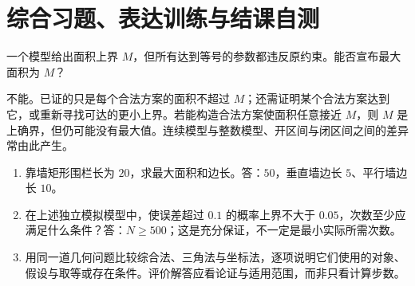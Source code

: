 \section{综合习题、表达训练与结课自测}
\begin{example}
一个模型给出面积上界 $M$，但所有达到等号的参数都违反原约束。能否宣布最大面积为 $M$？
\end{example}
\begin{solve}
不能。已证的只是每个合法方案的面积不超过 $M$；还需证明某个合法方案达到它，或重新寻找可达的更小上界。若能构造合法方案使面积任意接近 $M$，则 $M$ 是上确界，但仍可能没有最大值。连续模型与整数模型、开区间与闭区间之间的差异常由此产生。
\end{solve}
\begin{enumerate}
\item 靠墙矩形围栏长为 $20$，求最大面积和边长。答：$50$，垂直墙边长 $5$、平行墙边长 $10$。
\item 在上述独立模拟模型中，使误差超过 $0.1$ 的概率上界不大于 $0.05$，次数至少应满足什么条件？答：$N\ge500$；这是充分保证，不一定是最小实际所需次数。
\item 用同一道几何问题比较综合法、三角法与坐标法，逐项说明它们使用的对象、假设与取等或存在条件。评价解答应看论证与适用范围，而非只看计算步数。
\end{enumerate}

